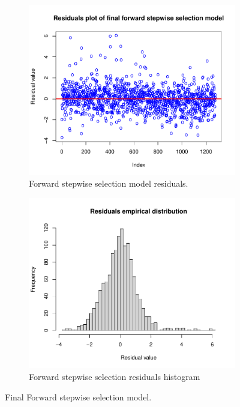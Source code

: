\begin{figure}[h]
	\centering
	\begin{subfigure}{.6\textwidth}
		\centering
		\includegraphics[width=0.6\linewidth]{ImageFiles/Regression/Forward/ForwardFinalModelResiduals}
		\caption{Forward stepwise selection model residuals.}
		\label{fig:ForwardFinalModelResiduals}
	\end{subfigure}%
	\begin{subfigure}{.6\textwidth}
		\centering
		\includegraphics[width=0.6\linewidth]{ImageFiles/Regression/Forward/ForwardFinalModelResidualsDist}
		\caption{Forward stepwise selection residuals histogram}
		\label{fig:ForwardFinalModelResidualsDist}
	\end{subfigure}
	\caption{Final Forward stepwise selection model.}
	\label{fig:FinalFSSM}
\end{figure}


